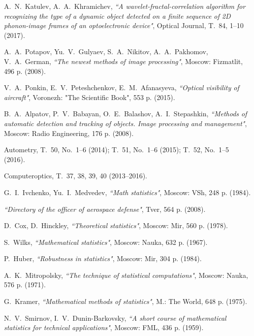 \documentclass[
11pt,%
tightenlines,%
twoside,%
onecolumn,%
nofloats,%
nobibnotes,%
nofootinbib,%
superscriptaddress,%
noshowpacs,%
centertags]%
{revtex4}
\begin{document}
\begin{thebibliography}{99}

A.~N.~Katulev, A.~A.~Khramichev, {\it ``A wavelet-fractal-correlation algorithm for recognizing the type of a dynamic object detected on a finite sequence of 2D phonon-image frames of an optoelectronic device"}, Optical Journal, T.~84, 1--10 (2017).

A.~A.~Potapov, Yu.~V.~Gulyaev, S.~A.~Nikitov, A.~A.~Pakhomov, V.~A.~German, {\it ``The newest methods of image processing"}, Moscow: Fizmatlit, 496 p. (2008).

V.~A.~Ponkin, E.~V.~Peteshchenkov, E.~M.~Afanasyeva, {\it ``Optical visibility of aircraft"}, Voronezh: "The Scientific Book", 553 p. (2015).

B.~A.~Alpatov, P.~V.~Babayan, O.~E.~Balashov, A.~I.~Stepashkin, {\it ``Methods of automatic detection and tracking of objects. Image processing and management"}, Moscow: Radio Engineering, 176 p. (2008).

Autometry, T.~50, No.~1--6 (2014); T.~51, No.~1--6 (2015); T.~52, No.~1--5 (2016).

Computeroptics, T.~37, 38, 39, 40 (2013--2016).

G.~I.~Ivchenko, Yu.~I.~Medvedev, {\it ``Math statistics"}, Moscow: VSh, 248 p. (1984).

{\it ``Directory of the officer of aerospace defense"}, Tver, 564 p. (2008).

D.~Cox, D.~Hinckley, {\it ``Theoretical statistics"}, Moscow: Mir, 560 p. (1978).

S.~Wilks, {\it ``Mathematical statistics"}, Moscow: Nauka, 632 p. (1967).

P.~Huber, {\it ``Robustness in statistics"}, Moscow: Mir, 304 p. (1984).

A.~K.~Mitropolsky, {\it ``The technique of statistical computations"}, Moscow: Nauka, 576 p. (1971).

G.~Kramer, {\it ``Mathematical methods of statistics"}, M.: The World, 648 p. (1975).

N.~V.~Smirnov, I.~V.~Dunin-Barkovsky, {\it ``A short course of mathematical statistics for technical applications"}, Moscow: FML, 436 p. (1959).


\end{thebibliography}
\end{document}
